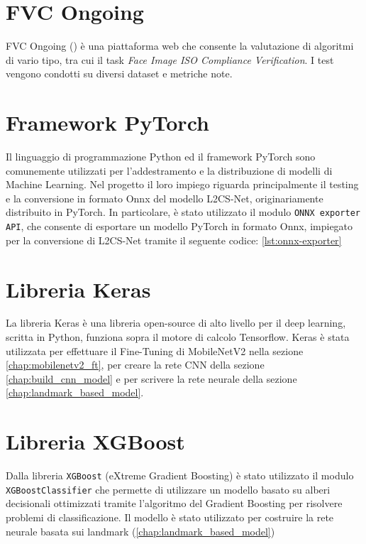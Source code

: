 \documentclass[12pt,a4paper,openright,twoside]{book}
\begin{document}
\section{FVC Ongoing}
FVC Ongoing (\cite{fvcongoing}) è una piattaforma web che consente la valutazione di algoritmi di vario tipo, tra cui il task \textit{Face Image ISO Compliance Verification}.
I test vengono condotti su diversi dataset e metriche note.

\section{Framework PyTorch}
Il linguaggio di programmazione Python ed il framework PyTorch sono comunemente utilizzati per l'addestramento e la distribuzione di modelli di Machine Learning. 
Nel progetto il loro impiego riguarda principalmente il testing e la conversione in formato Onnx del modello L2CS-Net, originariamente distribuito in PyTorch.
In particolare, è stato utilizzato il modulo \texttt{ONNX exporter API}, che consente di esportare un modello PyTorch in formato Onnx, impiegato per la conversione di L2CS-Net tramite il seguente codice: \cref{lst:onnx-exporter}

\section{Libreria Keras}
La libreria Keras è una libreria open-source di alto livello per il deep learning, scritta in Python, funziona sopra il motore di calcolo Tensorflow.
Keras è stata utilizzata per effettuare il Fine-Tuning di MobileNetV2 nella sezione \ref{chap:mobilenetv2_ft}, per creare la rete CNN della sezione \ref{chap:build_cnn_model} e per scrivere la rete neurale della sezione \ref{chap:landmark_based_model}.

\section{Libreria XGBoost}
Dalla libreria \texttt{XGBoost} (eXtreme Gradient Boosting) è stato utilizzato il modulo \texttt{XGBoostClassifier} che permette di utilizzare un modello basato su alberi decisionali ottimizzati tramite l'algoritmo del Gradient Boosting per risolvere problemi di classificazione.
Il modello è stato utilizzato per costruire la rete neurale basata sui landmark (\ref{chap:landmark_based_model})


\end{document}
